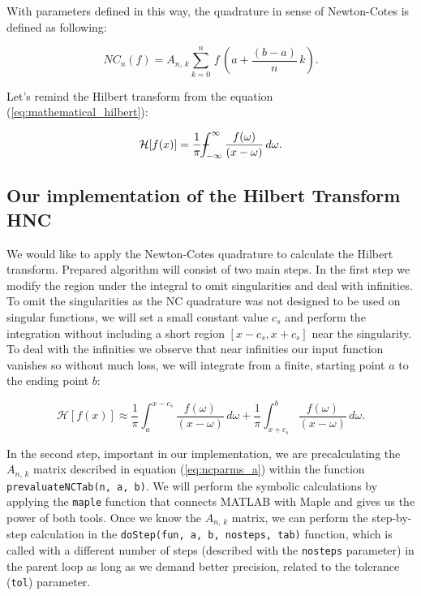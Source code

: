 \documentclass[12pt,twoside,a4paper]{article}
\numberwithin{equation}{subsection}
\numberwithin{figure}{subsection}
\def\Xint#1{\mathchoice
{\XXint\displaystyle\textstyle{#1}}%
{\XXint\textstyle\scriptstyle{#1}}%
{\XXint\scriptstyle\scriptscriptstyle{#1}}%
{\XXint\scriptscriptstyle\scriptscriptstyle{#1}}%
\!\int}
\def\XXint#1#2#3{{\setbox0=\hbox{$#1{#2#3}{\int}$ }\vcenter{\hbox{$#2#3$ }}\kern-.6\wd0}}
\def\dashint{\Xint-}
\begin{document}
With parameters defined in this way, the quadrature in sense of Newton-Cotes is defined as following:

\begin{equation} \label{eq:nc_mainequation}
   NC_{n} (f) = { A_{n, \, k} } \sum_{ k = 0 }^{n} \, f \, (a + \frac {(b - a)} {n} \, k) . 
\end{equation}

Let's remind the Hilbert transform from the equation (\ref{eq:mathematical_hilbert}):

\begin{equation} \label{eq:nc_hilbert_remind}
	\mathcal{H}[f(x)] = \frac{1}{\pi} \dashint_{ - \infty }^{\infty } \frac{f(\omega)}{(x - \omega)} \, d\omega . 
\end{equation}

\subsection{Our implementation of the Hilbert Transform HNC}  \label{chap:nc_hilbert_transform}

We would like to apply the Newton-Cotes quadrature to calculate the Hilbert transform. Prepared algorithm will consist of two main steps. In the first step we modify the region under the integral to omit singularities and deal with infinities. To omit the singularities as the NC quadrature was not designed to be used on singular functions, we will set a small constant value $c_s$ and perform the integration without including a short region $[x - c_s, x + c_s]$ near the singularity. To deal with the infinities we observe that near infinities our input function vanishes so without much loss, we will integrate from a finite, starting point $a$ to the ending point $b$:

\begin{equation}
	\mathcal{H}[f(x)] \approx \frac{1}{\pi} \int_{ a }^{ x - c_s } \frac{ f(\omega) }{ (x - \omega) } \, d\omega 
                           +  \frac{1}{\pi} \int_{ x + c_s }^{ b } \frac{ f(\omega) }{ (x - \omega) } \, d\omega .
\end{equation} 

In the second step, important in our implementation, we are pre\-calculating the $A_{n, \, k}$ matrix described in equation (\ref{eq:ncparms_a}) within the function \texttt{prevaluateNCTab(n, a, b)}. We will perform the symbolic calculations by applying the \texttt{maple} function that connects MATLAB with Maple and gives us the power of both tools. Once we know the $A_{n, \, k}$ matrix, we can perform the step-by-step calculation in the \texttt{doStep(fun, a, b, nosteps, tab)} function, which is called with a different number of steps (described with the \texttt{nosteps} parameter) in the parent loop as long as we demand better precision, related to the tolerance (\texttt{tol}) parameter.
\end{document}
